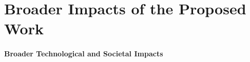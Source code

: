 \documentclass[letterpaper, 11 pt, onecolumn]{article}
\begin{document}
\section{Broader Impacts of the Proposed Work}\label{sec:impact}


\paragraph*{Broader Technological and Societal Impacts} 
\end{document}
